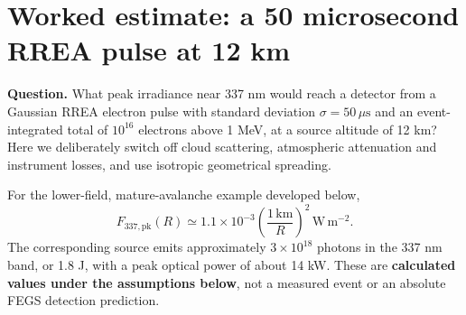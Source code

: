 \documentclass[11pt,a4paper]{article}
\newcommand{\nextsection}[1]{\clearpage\section{#1}}
\begin{document}
\nextsection{Worked estimate: a 50 microsecond RREA pulse at 12 km}
\label{sec:estimate}
\textbf{Question.} What peak irradiance near 337 nm would reach a detector from a Gaussian RREA electron pulse with standard deviation $\sigma=50\,\mu\mathrm{s}$ and an event-integrated total of $10^{16}$ electrons above 1 MeV, at a source altitude of 12 km? Here we deliberately switch off cloud scattering, atmospheric attenuation and instrument losses, and use isotropic geometrical spreading.

\begin{keybox}
For the lower-field, mature-avalanche example developed below,
\[
 \boxed{F_{337,\mathrm{pk}}(R)\simeq
 1.1\times10^{-3}\left(\frac{1\,\mathrm{km}}{R}\right)^2
 \,\mathrm{W\,m^{-2}}.}
\]
The corresponding source emits approximately $3\times10^{18}$ photons in the 337 nm band, or 1.8 J, with a peak optical power of about 14 kW. These are \textbf{calculated values under the assumptions below}, not a measured event or an absolute FEGS detection prediction.
\end{keybox}
\end{document}

